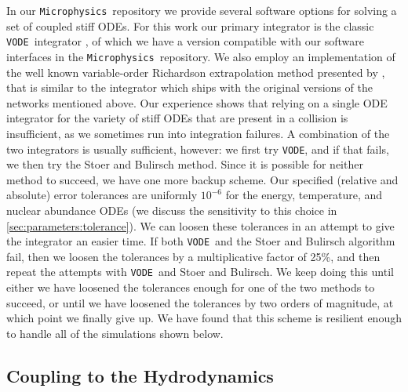 \documentclass[twocolumn,numberedappendix]{../aastex6}
\newcommand{\microphysics}{\texttt{Microphysics}}
\newcommand{\vode}{\texttt{VODE}}
\begin{document}
In our \microphysics\ repository we provide several software options for
solving a set of coupled stiff ODEs. For this work our primary integrator
is the classic \vode\ integrator \citep{vode}, of which we have a version
compatible with our software interfaces in the \microphysics\ repository.
We also employ an implementation of the well known variable-order Richardson
extrapolation method presented by \citet{stoer:1980}, that is similar to the
integrator which ships with the original versions of the networks mentioned
above. Our experience shows that relying on a single ODE integrator for the
variety of stiff ODEs that are present in a collision is insufficient, as we
sometimes run into integration failures. A combination of the two integrators
is usually sufficient, however: we first try \vode, and if that fails, we then
try the Stoer and Bulirsch method. Since it is possible for neither method to
succeed, we have one more backup scheme. Our specified (relative and absolute)
error tolerances are uniformly $10^{-6}$ for the energy, temperature, and nuclear
abundance ODEs (we discuss the sensitivity to this choice in
\autoref{sec:parameters:tolerance}). We can loosen these tolerances in an
attempt to give the integrator an easier time. If both \vode\ and the Stoer
and Bulirsch algorithm fail, then we loosen the tolerances by a multiplicative
factor of 25\%, and then repeat the attempts with \vode\ and Stoer and Bulirsch.
We keep doing this until either we have loosened the tolerances enough for one
of the two methods to succeed, or until we have loosened the tolerances by two
orders of magnitude, at which point we finally give up. We have found that this
scheme is resilient enough to handle all of the simulations shown below.

\subsection{Coupling to the Hydrodynamics}
\label{sec:hydrocoupling}
\end{document}
